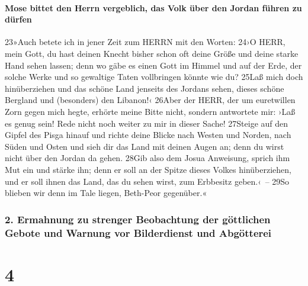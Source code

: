 \hypertarget{mose-bittet-den-herrn-vergeblich-das-volk-uxfcber-den-jordan-fuxfchren-zu-duxfcrfen}{%
\paragraph{Mose bittet den Herrn vergeblich, das Volk über den Jordan
führen zu
dürfen}\label{mose-bittet-den-herrn-vergeblich-das-volk-uxfcber-den-jordan-fuxfchren-zu-duxfcrfen}}

23»Auch betete ich in jener Zeit zum HERRN mit den Worten: 24›O HERR,
mein Gott, du hast deinen Knecht bisher schon oft deine Größe und deine
starke Hand sehen lassen; denn wo gäbe es einen Gott im Himmel und auf
der Erde, der solche Werke und so gewaltige Taten vollbringen könnte wie
du? 25Laß mich doch hinüberziehen und das schöne Land jenseits des
Jordans sehen, dieses schöne Bergland und (besonders) den Libanon!‹
26Aber der HERR, der um euretwillen Zorn gegen mich hegte, erhörte meine
Bitte nicht, sondern antwortete mir: ›Laß es genug sein! Rede nicht noch
weiter zu mir in dieser Sache! 27Steige auf den Gipfel des Pisga hinauf
und richte deine Blicke nach Westen und Norden, nach Süden und Osten und
sieh dir das Land mit deinen Augen an; denn du wirst nicht über den
Jordan da gehen. 28Gib also dem Josua Anweisung, sprich ihm Mut ein und
stärke ihn; denn er soll an der Spitze dieses Volkes hinüberziehen, und
er soll ihnen das Land, das du sehen wirst, zum Erbbesitz geben.‹~--
29So blieben wir denn im Tale liegen, Beth-Peor gegenüber.«

\hypertarget{ermahnung-zu-strenger-beobachtung-der-guxf6ttlichen-gebote-und-warnung-vor-bilderdienst-und-abguxf6tterei}{%
\subsubsection{2. Ermahnung zu strenger Beobachtung der göttlichen
Gebote und Warnung vor Bilderdienst und
Abgötterei}\label{ermahnung-zu-strenger-beobachtung-der-guxf6ttlichen-gebote-und-warnung-vor-bilderdienst-und-abguxf6tterei}}

\hypertarget{section-3}{%
\section{4}\label{section-3}}

